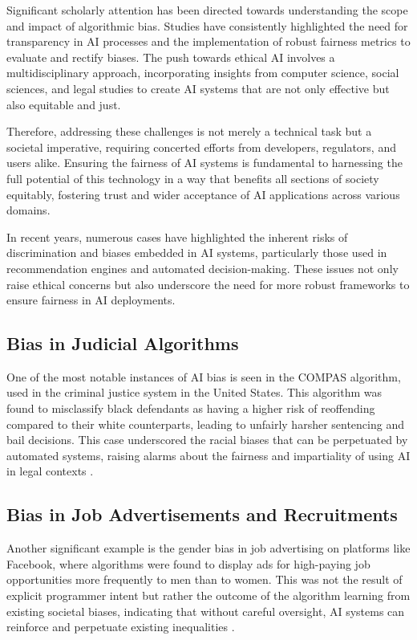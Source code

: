 Significant scholarly attention has been directed towards understanding the scope and impact of algorithmic bias. Studies have consistently highlighted the need for transparency in AI processes and the implementation of robust fairness metrics to evaluate and rectify biases. The push towards ethical AI involves a multidisciplinary approach, incorporating insights from computer science, social sciences, and legal studies to create AI systems that are not only effective but also equitable and just.

Therefore, addressing these challenges is not merely a technical task but a societal imperative, requiring concerted efforts from developers, regulators, and users alike. Ensuring the fairness of AI systems is fundamental to harnessing the full potential of this technology in a way that benefits all sections of society equitably, fostering trust and wider acceptance of AI applications across various domains.

In recent years, numerous cases have highlighted the inherent risks of discrimination and biases embedded in AI systems, particularly those used in recommendation engines and automated decision-making. These issues not only raise ethical concerns but also underscore the need for more robust frameworks to ensure fairness in AI deployments.

\subsection{Bias in Judicial Algorithms}
One of the most notable instances of AI bias is seen in the COMPAS algorithm, used in the criminal justice system in the United States. This algorithm was found to misclassify black defendants as having a higher risk of reoffending compared to their white counterparts, leading to unfairly harsher sentencing and bail decisions. This case underscored the racial biases that can be perpetuated by automated systems, raising alarms about the fairness and impartiality of using AI in legal contexts \cite{Mattu_COMPAS}.

\subsection{Bias in Job Advertisements and Recruitments}
Another significant example is the gender bias in job advertising on platforms like Facebook, where algorithms were found to display ads for high-paying job opportunities more frequently to men than to women. This was not the result of explicit programmer intent but rather the outcome of the algorithm learning from existing societal biases, indicating that without careful oversight, AI systems can reinforce and perpetuate existing inequalities \cite{Lambrecht_Tucker_2019}.

